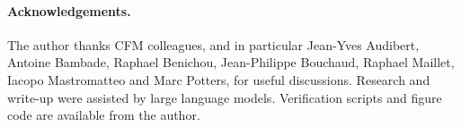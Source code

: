 \documentclass[11pt]{article}
\theoremstyle{plain}
\theoremstyle{definition}
\theoremstyle{remark}
\begin{document}
\paragraph{Acknowledgements.} The author thanks CFM colleagues, and in particular Jean-Yves Audibert, Antoine Bambade, Raphael Benichou, Jean-Philippe Bouchaud, Raphael Maillet, Iacopo Mastromatteo and Marc Potters, for useful discussions. Research and write-up were assisted by large language models. Verification scripts and figure code are available from the author.



\end{document}
